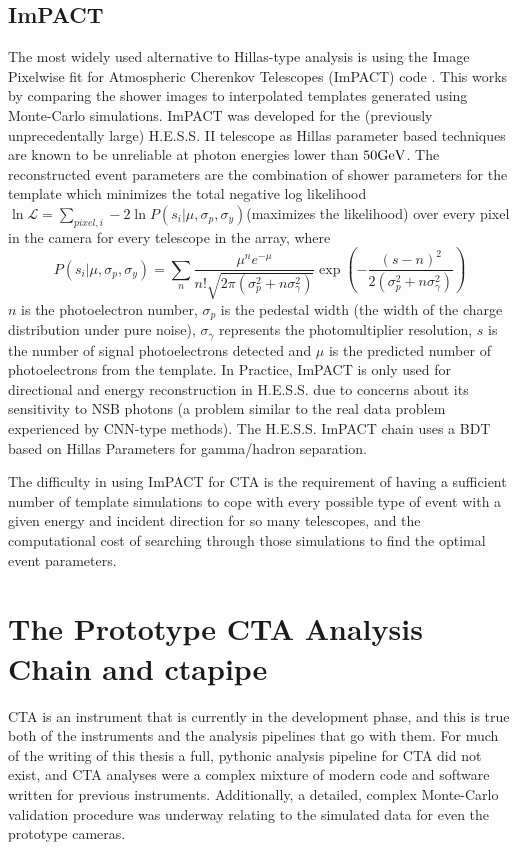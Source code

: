 \subsection{ImPACT}
The most widely used alternative to Hillas-type analysis is using the Image Pixelwise fit for Atmospheric Cherenkov Telescopes (ImPACT) code \cite{impact}. This works by comparing the shower images to interpolated templates generated using Monte-Carlo simulations. ImPACT was developed for the (previously unprecedentally large) H.E.S.S. II telescope as Hillas parameter based techniques are known to be unreliable at photon energies lower than $50\rm{Ge}V$.  The reconstructed event parameters are the combination of shower parameters for the template which minimizes the total negative log likelihood $\ln\mathcal{L}=\sum_{pixel,i}-2\ln{P(s_i|\mu,\sigma_p,\sigma_y)}$(maximizes the likelihood) over every pixel in the camera for every telescope in the array, where
\begin{equation}
P(s_i|\mu,\sigma_p,\sigma_y)=\sum_n \frac{\mu^n e^{-\mu}}{n!\sqrt{2\pi (\sigma_p^2+n\sigma_{\gamma}^2)}} \exp \left(-\frac{(s-n)^2}{2(\sigma_p^2 + n \sigma_{\gamma}^2)} \right)
\end{equation}
$n$ is the photoelectron number, $\sigma_p$ is the pedestal width (the width of the charge distribution under pure noise), $\sigma_{\gamma}$ represents the photomultiplier resolution, $s$ is the number of signal photoelectrons detected and $\mu$ is the predicted number of photoelectrons from the template. In Practice, ImPACT is only used for directional and energy reconstruction in H.E.S.S. due to concerns about its sensitivity to NSB photons (a problem similar to the real data problem experienced by CNN-type methods). The H.E.S.S. ImPACT chain uses a BDT based on Hillas Parameters for gamma/hadron separation.

The difficulty in using ImPACT for CTA is the requirement of having a sufficient number of template simulations to cope with every possible type of event with a given energy and incident direction for so many telescopes, and the computational cost of searching through those simulations to find the optimal event parameters.

\section{The Prototype CTA Analysis Chain and ctapipe}

CTA is an instrument that is currently in the development phase, and this is true both of the instruments and the analysis pipelines that go with them. For much of the writing of this thesis a full, pythonic analysis pipeline for CTA did not exist, and CTA analyses were a complex mixture of modern code and software written for previous instruments. Additionally, a detailed, complex Monte-Carlo validation procedure was underway relating to the simulated data for even the prototype cameras.

